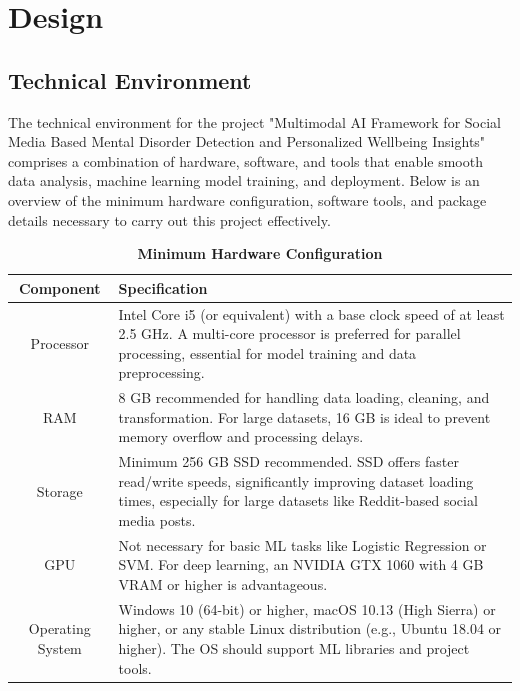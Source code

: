 
\section{Design}

\subsection{Technical Environment}
\noindent
The technical environment for the project "Multimodal AI Framework for Social Media Based Mental Disorder Detection and Personalized Wellbeing Insights" comprises a combination of hardware, software, and tools that enable smooth data analysis, machine learning model training, and deployment. Below is an overview of the minimum hardware configuration, software tools, and package details necessary to carry out this project effectively. 

\begin{table}[h]
    \centering
    \renewcommand{\arraystretch}{1.2}
    \begin{tabular}{|c|p{12cm}|}
        \hline
        \textbf{Component} & \textbf{Specification} \\
        \hline
        Processor & Intel Core i5 (or equivalent) with a base clock speed of at least 2.5 GHz. A multi-core processor is preferred for parallel processing, essential for model training and data preprocessing. \\
        \hline
        RAM & 8 GB recommended for handling data loading, cleaning, and transformation. For large datasets, 16 GB is ideal to prevent memory overflow and processing delays. \\
        \hline
        Storage & Minimum 256 GB SSD recommended. SSD offers faster read/write speeds, significantly improving dataset loading times, especially for large datasets like Reddit-based social media posts. \\
        \hline
        GPU & Not necessary for basic ML tasks like Logistic Regression or SVM. For deep learning, an NVIDIA GTX 1060 with 4 GB VRAM or higher is advantageous. \\
        \hline
        Operating System & Windows 10 (64-bit) or higher, macOS 10.13 (High Sierra) or higher, or any stable Linux distribution (e.g., Ubuntu 18.04 or higher). The OS should support ML libraries and project tools. \\
        \hline
    \end{tabular}
    \caption*{\textbf{Minimum Hardware Configuration}}
\end{table}


